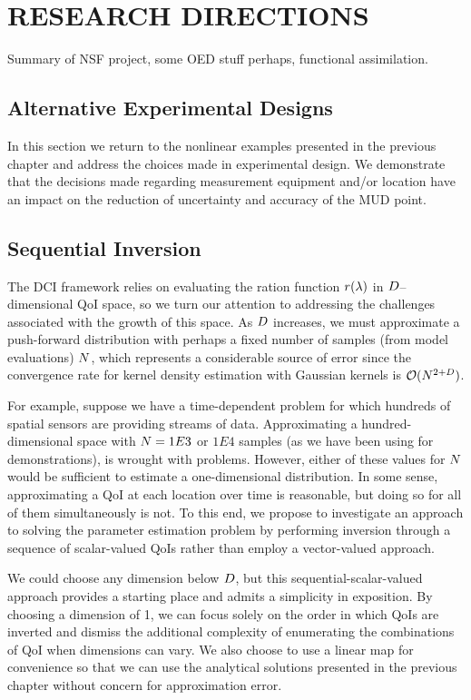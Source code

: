\chapter{\uppercase{Research Directions} \label{chapter:05}}

Summary of NSF project, some OED stuff perhaps, functional assimilation.

\section{Alternative Experimental Designs}

In this section we return to the nonlinear examples presented in the previous chapter and address the choices made in experimental design.
We demonstrate that the decisions made regarding measurement equipment and/or location have an impact on the reduction of uncertainty and accuracy of the MUD point.

\section{Sequential Inversion}\label{sec:ch05-sequential}

The DCI framework relies on evaluating the ration function $r(\lambda)$ in $D$--dimensional QoI space, so we turn our attention to addressing the challenges associated with the growth of this space.
As $D$ increases, we must approximate a push-forward distribution with perhaps a fixed number of samples (from model evaluations) $N$, which represents a considerable source of error since the convergence rate for kernel density estimation with Gaussian kernels is $\mathcal{O} (N^{2+D})$.

For example, suppose we have a time-dependent problem for which hundreds of spatial sensors are providing streams of data.
Approximating a hundred-dimensional space with $N = 1E3$ or $1E4$ samples (as we have been using for demonstrations), is wrought with problems.
However, either of these values for $N$ would be sufficient to estimate a one-dimensional distribution.
In some sense, approximating a QoI at each location over time is reasonable, but doing so for all of them simultaneously is not.
To this end, we propose to investigate an approach to solving the parameter estimation problem by performing inversion through a sequence of scalar-valued QoIs rather than employ a vector-valued approach.

We could choose any dimension below $D$, but this sequential-scalar-valued approach provides a starting place and admits a simplicity in exposition.
By choosing a dimension of 1, we can focus solely on the order in which QoIs are inverted and dismiss the additional complexity of enumerating the combinations of QoI when dimensions can vary.
We also choose to use a linear map for convenience so that we can use the analytical solutions presented in the previous chapter without concern for approximation error.

